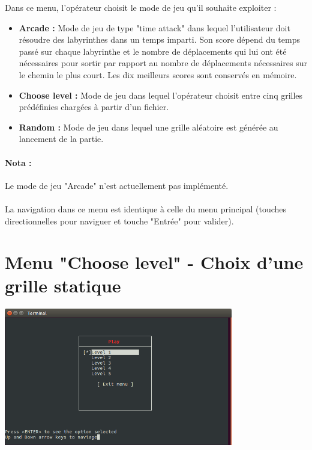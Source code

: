 Dans ce menu, l'opérateur choisit le mode de jeu qu'il souhaite exploiter :
\begin{itemize}
	\item \textbf{Arcade :} Mode de jeu de type "time attack" dans lequel l'utilisateur doit résoudre des labyrinthes dans un temps imparti. Son score dépend du temps passé sur chaque labyrinthe et le nombre de déplacements qui lui ont été nécessaires pour sortir par rapport au nombre de déplacements nécessaires sur le chemin le plus court. Les dix meilleurs scores sont conservés en mémoire.
	\item \textbf{Choose level :} Mode de jeu dans lequel l'opérateur choisit entre cinq grilles prédéfinies chargées à partir d'un fichier.
	\item \textbf{Random :} Mode de jeu dans lequel une grille aléatoire est générée au lancement de la partie.
\end{itemize}

\paragraph{Nota :} Le mode de jeu "Arcade" n'est actuellement pas implémenté.

\paragraph{}La navigation dans ce menu est identique à celle du menu principal (touches directionnelles pour naviguer et touche "Entrée" pour valider).


\section{Menu "Choose level" - Choix d'une grille statique}

\begin{center}
	\includegraphics[width=0.75\textwidth]{annexe-manuel_utilisateur/rsrc/Menu_Play-grilles.png}
\end{center}

